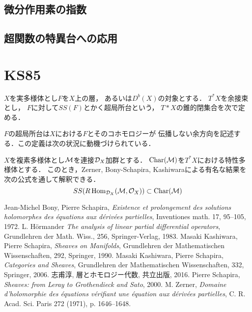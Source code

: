 \subsection{微分作用素の指数}

\subsection{超関数の特異台への応用}

\section{KS85}
\(X\)を実多様体とし\(F\)を\(X\)上の層，
あるいは\(D^b(X)\)の対象とする．
\(T^\ast X\)を余接束とし，
\(F\)に対して\(SS(F)\)とかく超局所台という，
\(T\ast X\)の錐的閉集合を次で定める．

\(F\)の超局所台は\(X\)における\(F\)とそのコホモロジーが
伝播しない余方向を記述する．この定義は次の状況に動機づけられている．

\(X\)を複素多様体とし\(\mathcal{M}\)を連接\(\mathcal{D}_X\)加群とする．
\(\mathop{\mathrm{Char}}\nolimits(\mathcal{M})\)を\(T^\ast X\)における特性多様体とする．
このとき，Zerner, Bony-Schapira, Kashiwaraによる有名な結果を次の公式を通して解釈できる．
\[SS(R\mathop{\mathrm{Hom}}\nolimits_{\mathcal{D}_X}(\mathcal{M},\mathcal{O}_X))\subset\mathop{\mathrm{Char}}\nolimits(\mathcal{M})\]





\begin{thebibliography}{20} 
     Jean-Michel Bony, Pierre Schapira, 
    \textit{Existence et prolongement des solutions holomorphes 
    des \'equations aux d\'eriv\'ees partielles}, Inventiones math. 17, 95--105, 1972.
     L. H\"ormander 
    \textit{The analysis of linear partial differential operators}, 
    Grundlehren der Math. Wiss., 256, Springer-Verlag, 1983.
     Masaki Kashiwara, Pierre Schapira, 
        \textit{Sheaves on Manifolds}, 
        Grundlehren der Mathematischen Wissenschaften, 292, Springer, 1990.
     Masaki Kashiwara, Pierre Schapira, 
        \textit{Categories and Sheaves}, 
        Grundlehren der Mathematischen Wissenschaften, 332, Springer, 2006.
     志甫淳, 層とホモロジー代数, 共立出版, 2016.
     Pierre Schapira, \textit{Sheaves: from Leray to Grothendieck and Sato}, 2000.
    M. Zerner, \textit{Domaine d'holomorphie des \'equations v\'erifiant une \'equation aux d\'eriv\'ees partielles}, 
    C. R. Acad. Sci. Paris 272 (1971), p. 1646--1648.
\end{thebibliography}



